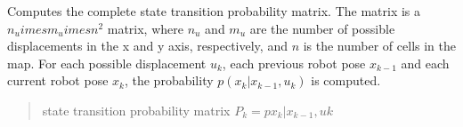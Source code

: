 \documentclass[letterpaper,10pt,english]{sphinxmanual}
\begin{document}
\begin{fulllineitems}
\begin{fulllineitems}
\label{\detokenize{GridLocalization:GL_4DOFAUV.GL_4DOFAUV.StateTransitionProbability}}
\pysigstartsignatures
{}
\pysigstopsignatures
\sphinxAtStartPar
Computes the complete state transition probability matrix. The matrix is a \(n_u   imes m_u        imes n^2\) matrix,
where \(n_u\) and \(m_u\) are the number of possible displacements in the x and y axis, respectively, and
\(n\) is the number of cells in the map. For each possible displacement \(u_k\), each previous robot pose
\({x_{k-1}}\) and each current robot pose \({x_k}\), the probability \(p(x_k|x_{k-1},u_k)\) is computed.
\begin{quote}\begin{description}
\sphinxAtStartPar
state transition probability matrix \(P_k=p{x_k|x_{k-1},uk}\)

\end{description}\end{quote}

\end{fulllineitems}


\begin{fulllineitems}
\label{\detokenize{GridLocalization:GL_4DOFAUV.GL_4DOFAUV.uk2cell}}
\pysigstartsignatures
{}
\pysigstopsignatures\begin{quote}\begin{description}
\sphinxAtStartPar
{} \textendash{} 

\sphinxAtStartPar


\end{description}\end{quote}

\end{fulllineitems}



\end{fulllineitems}
\end{document}
